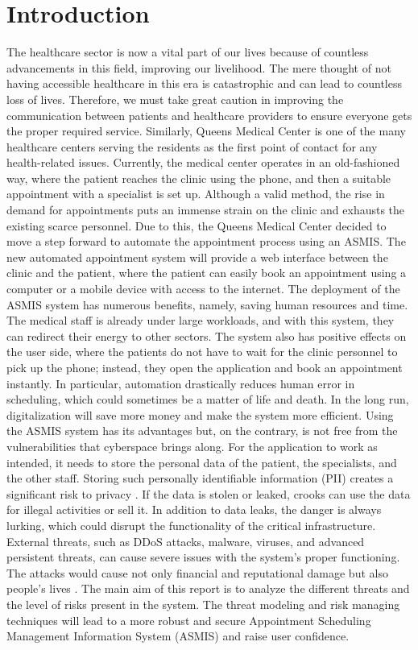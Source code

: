 \chapter{Introduction}
The healthcare sector is now a vital part of our lives because of countless advancements in this field, improving our livelihood. The mere thought of not having accessible healthcare in this era is catastrophic and can lead to countless loss of lives. Therefore, we must take great caution in improving the communication between patients and healthcare providers to ensure everyone gets the proper required service.\newline \newline
Similarly, Queens Medical Center is one of the many healthcare centers serving the residents as the first point of contact for any health-related issues. Currently, the medical center operates in an old-fashioned way, where the patient reaches the clinic using the phone, and then a suitable appointment with a specialist is set up. Although a valid method, the rise in demand for appointments puts an immense strain on the clinic and exhausts the existing scarce personnel. Due to this, the Queens Medical Center decided to move a step forward to automate the appointment process using an ASMIS. The new automated appointment system will provide a web interface between the clinic and the patient, where the patient can easily book an appointment using a computer or a mobile device with access to the internet.\newline\newline
The deployment of the ASMIS system has numerous benefits, namely, saving human resources and time. The medical staff is already under large workloads, and with this system, they can redirect their energy to other sectors. The system also has positive effects on the user side, where the patients do not have to wait for the clinic personnel to pick up the phone; instead, they open the application and book an appointment instantly. In particular, automation drastically reduces human error in scheduling, which could sometimes be a matter of life and death. In the long run, digitalization will save more money and make the system more efficient.\newline\newline
Using the ASMIS system has its advantages but, on the contrary, is not free from the vulnerabilities that cyberspace brings along. For the application to work as intended, it needs to store the personal data of the patient, the specialists, and the other staff. Storing such personally identifiable information (PII) creates a significant risk to privacy \citep[p.~374]{IOT}. If the data is stolen or leaked, crooks can use the data for illegal activities or sell it. In addition to data leaks, the danger is always lurking, which could disrupt the functionality of the critical infrastructure. External threats, such as DDoS attacks, malware, viruses, and advanced persistent threats, can cause severe issues with the system's proper functioning. The attacks would cause not only financial and reputational damage but also people's lives \citep[p.~377]{IOT}.\newline\newline
The main aim of this report is to analyze the different threats and the level of risks present in the system. The threat modeling and risk managing techniques will lead to a more robust and secure Appointment Scheduling Management Information System (ASMIS) and raise user confidence.
